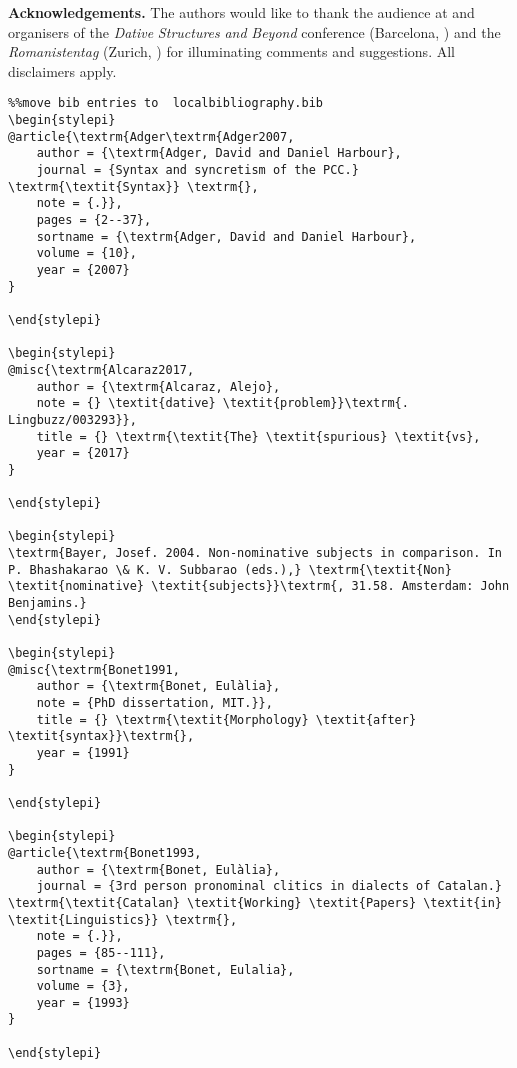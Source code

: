 \documentclass[output=paper,modfonts,nonflat]{langsci/langscibook}
\begin{document}
\textbf{Acknowledgements.} The authors would like to thank the audience at and organisers of the \textit{Dative} \textit{Structures} \textit{and} \textit{Beyond} conference (Barcelona, \citealt{January2017}) and the \textit{Romanistentag} (Zurich, \citealt{October2017}) for illuminating comments and suggestions. All disclaimers apply.

\bfseries
\begin{verbatim}%%move bib entries to  localbibliography.bib
\begin{stylepi}
@article{\textrm{Adger\textrm{Adger2007,
	author = {\textrm{Adger, David and Daniel Harbour},
	journal = {Syntax and syncretism of the PCC.} \textrm{\textit{Syntax}} \textrm{},
	note = {.}},
	pages = {2--37},
	sortname = {\textrm{Adger, David and Daniel Harbour},
	volume = {10},
	year = {2007}
}

\end{stylepi}

\begin{stylepi}
@misc{\textrm{Alcaraz2017,
	author = {\textrm{Alcaraz, Alejo},
	note = {} \textit{dative} \textit{problem}}\textrm{. Lingbuzz/003293}},
	title = {} \textrm{\textit{The} \textit{spurious} \textit{vs},
	year = {2017}
}

\end{stylepi}

\begin{stylepi}
\textrm{Bayer, Josef. 2004. Non-nominative subjects in comparison. In P. Bhashakarao \& K. V. Subbarao (eds.),} \textrm{\textit{Non} \textit{nominative} \textit{subjects}}\textrm{, 31.58. Amsterdam: John Benjamins.}
\end{stylepi}

\begin{stylepi}
@misc{\textrm{Bonet1991,
	author = {\textrm{Bonet, Eulàlia},
	note = {PhD dissertation, MIT.}},
	title = {} \textrm{\textit{Morphology} \textit{after} \textit{syntax}}\textrm{},
	year = {1991}
}

\end{stylepi}

\begin{stylepi}
@article{\textrm{Bonet1993,
	author = {\textrm{Bonet, Eulàlia},
	journal = {3rd person pronominal clitics in dialects of Catalan.} \textrm{\textit{Catalan} \textit{Working} \textit{Papers} \textit{in} \textit{Linguistics}} \textrm{},
	note = {.}},
	pages = {85--111},
	sortname = {\textrm{Bonet, Eulalia},
	volume = {3},
	year = {1993}
}

\end{stylepi}


\end{verbatim}
\end{document}
